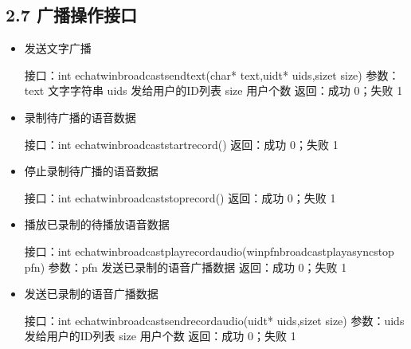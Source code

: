 \documentclass[letterpaper,10pt,english]{sphinxmanual}
\begin{document}
\subsection{2.7 广播操作接口}
\label{\detokenize{c_win:id9}}\begin{itemize}
\item {} 
发送文字广播

%
\begin{sphinxVerbatim}[commandchars=\\\{\}]
接口：int echat\PYGZus{}win\PYGZus{}broadcast\PYGZus{}send\PYGZus{}text(char* text,uid\PYGZus{}t* uids,size\PYGZus{}t size)
参数：text  文字字符串
  uids  发给用户的ID列表
  size  用户个数
返回：成功 0；失败 \PYGZhy{}1
\end{sphinxVerbatim}

\item {} 
录制待广播的语音数据

%
\begin{sphinxVerbatim}[commandchars=\\\{\}]
接口：int echat\PYGZus{}win\PYGZus{}broadcast\PYGZus{}start\PYGZus{}record()
返回：成功 0；失败 \PYGZhy{}1
\end{sphinxVerbatim}

\item {} 
停止录制待广播的语音数据

%
\begin{sphinxVerbatim}[commandchars=\\\{\}]
接口：int echat\PYGZus{}win\PYGZus{}broadcast\PYGZus{}stop\PYGZus{}record()
返回：成功 0；失败 \PYGZhy{}1
\end{sphinxVerbatim}

\item {} 
播放已录制的待播放语音数据

%
\begin{sphinxVerbatim}[commandchars=\\\{\}]
接口：int echat\PYGZus{}win\PYGZus{}broadcast\PYGZus{}play\PYGZus{}recordaudio(win\PYGZus{}pfn\PYGZus{}broadcast\PYGZus{}play\PYGZus{}async\PYGZus{}stop pfn)
参数：pfn  发送已录制的语音广播数据
返回：成功 0；失败 \PYGZhy{}1
\end{sphinxVerbatim}

\item {} 
发送已录制的语音广播数据

%
\begin{sphinxVerbatim}[commandchars=\\\{\}]
接口：int echat\PYGZus{}win\PYGZus{}broadcast\PYGZus{}send\PYGZus{}recordaudio(uid\PYGZus{}t* uids,size\PYGZus{}t size)
参数：uids  发给用户的ID列表
  size  用户个数
返回：成功 0；失败 \PYGZhy{}1
\end{sphinxVerbatim}

\end{itemize}
\end{document}
